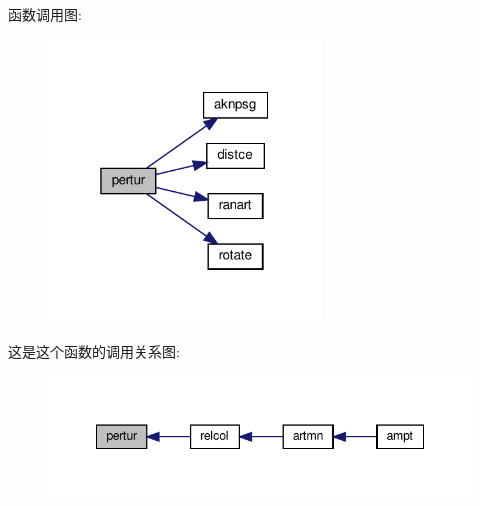 函数调用图\+:
\nopagebreak
\begin{figure}[H]
\begin{center}
\leavevmode
\includegraphics[width=205pt]{pertur_8f90_a7e7a44ee0a6a8de242b3b060ea6dd001_cgraph}
\end{center}
\end{figure}
这是这个函数的调用关系图\+:
\nopagebreak
\begin{figure}[H]
\begin{center}
\leavevmode
\includegraphics[width=348pt]{pertur_8f90_a7e7a44ee0a6a8de242b3b060ea6dd001_icgraph}
\end{center}
\end{figure}
